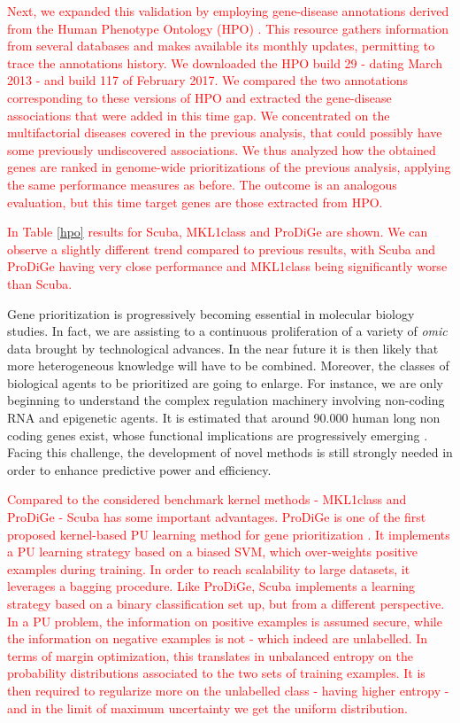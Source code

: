 \textcolor{red}{Next, we expanded this validation by employing gene-disease annotations derived from the Human Phenotype Ontology (HPO) \cite{hpo}. This resource gathers information from several databases and makes available its monthly updates, permitting to trace the annotations history. We downloaded the HPO build 29 - dating March 2013 - and build 117 of February 2017. We compared the two annotations corresponding to these versions of HPO and extracted the gene-disease associations that were added in this time gap. We concentrated on the multifactorial diseases covered in the previous analysis, that could possibly have some previously undiscovered associations. We thus analyzed how the obtained genes are ranked in genome-wide prioritizations of the previous analysis, applying the same performance measures as before. The outcome is an analogous evaluation, but this time target genes are those extracted from HPO.}
 
\textcolor{red}{In Table \ref{hpo} results for Scuba, MKL1class and ProDiGe are shown. We can observe a slightly different trend compared to previous results, with Scuba and ProDiGe having very close performance and MKL1class being significantly worse than Scuba.}

Gene prioritization is progressively becoming essential in molecular biology studies. In fact, we are assisting to a continuous proliferation of a variety of \emph{omic} data brought by technological advances. In the near future it is then likely that more heterogeneous knowledge will have to be combined. Moreover, the classes of biological agents to be prioritized are going to enlarge. For instance, we are only beginning to understand the complex regulation machinery involving non-coding RNA and epigenetic agents. It is estimated that around 90.000 human long non coding genes exist, whose functional implications are progressively emerging \cite{noncode}. Facing this challenge, the development of novel methods is still strongly needed in order to enhance predictive power and efficiency. 

\textcolor{red}{Compared to the considered benchmark kernel methods - MKL1class and ProDiGe - Scuba has some important advantages. ProDiGe is one of the first proposed kernel-based PU learning method for gene prioritization \cite{prodige}. It implements a PU learning strategy based on a biased SVM, which over-weights positive examples during training. In order to reach scalability to large datasets, it leverages a bagging procedure. Like ProDiGe, Scuba implements a learning strategy based on a binary classification set up, but from a different perspective. In a PU problem, the information on positive examples is assumed secure, while the information on negative examples is not - which indeed are unlabelled. In terms of margin optimization, this translates in unbalanced entropy on the probability distributions associated to the two sets of training examples. It is then required to regularize more on the unlabelled class - having higher entropy - and in the limit of maximum uncertainty we get the uniform distribution.}

